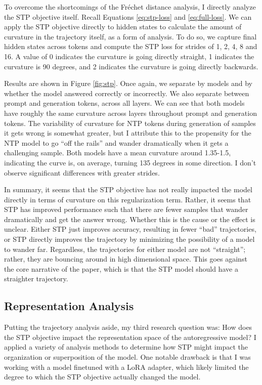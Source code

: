 \documentclass[11pt]{article}
\begin{document}
To overcome the shortcomings of the Fr\'{e}chet distance analysis, I directly analyze the STP objective itself. Recall Equations \ref{eq:stp-loss} and \ref{eq:full-loss}. We can apply the STP objective directly to hidden states to calculate the amount of curvature in the trajectory itself, as a form of analysis. To do so, we capture final hidden states across tokens and compute the STP loss for strides of 1, 2, 4, 8 and 16. A value of 0 indicates the curvature is going directly straight, 1 indicates the curvature is 90 degrees, and 2 indicates the curvature is going directly backwards.

Results are shown in Figure \ref{fig:stp}. Once again, we separate by models and by whether the model answered correctly or incorrectly. We also separate between prompt and generation tokens, across all layers. We can see that both models have roughly the same curvature across layers throughout prompt and generation tokens. The variability of curvature for NTP tokens during generation of samples it gets wrong is somewhat greater, but I attribute this to the propensity for the NTP model to go ``off the rails'' and wander dramatically when it gets a challenging sample. Both models have a mean curvature around 1.35-1.5, indicating the curve is, on average, turning 135 degrees in some direction. I don't observe significant differences with greater strides.

In summary, it seems that the STP objective has not really impacted the model directly in terms of curvature on this regularization term. Rather, it seems that STP has improved performance such that there are fewer samples that wander dramatically and get the answer wrong. Whether this is the cause or the effect is unclear. Either STP just improves accuracy, resulting in fewer ``bad'' trajectories, or STP directly improves the trajectory by minimizing the possibility of a model to wander far. Regardless, the trajectories for either model are not ``straight''; rather, they are bouncing around in high dimensional space. This goes against the core narrative of the paper, which is that the STP model should have a straighter trajectory.

\subsection{Representation Analysis}

Putting the trajectory analysis aside, my third research question was: How does the STP objective impact the representation space of the autoregressive model? I applied a variety of analysis methods to determine how STP might impact the organization or superposition of the model. One notable drawback is that I was working with a model finetuned with a LoRA adapter, which likely limited the degree to which the STP objective actually changed the model.
\end{document}
